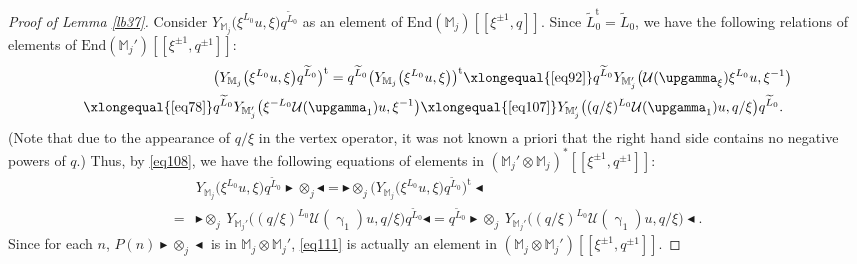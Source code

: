\documentclass[12pt,a4paper,notitlepage]{report}
\theoremstyle{definition}
\theoremstyle{plain}
\newcommand{\mc}{\mathcal}
\newcommand{\wtd}{\widetilde}
\newcommand{\tr}{\mathrm{t}} %
\newcommand{\End}{\mathrm{End}} %
\newcommand{\Mbb}{\mathbb M}
\newcommand{\btl}{\blacktriangleleft}
\newcommand{\btr}{\blacktriangleright}
\numberwithin{equation}{section}
\begin{document}
\begin{proof}[Proof of Lemma \ref{lb37}]
Consider $Y_{\Mbb_j}\big(\xi^{L_0}u,\xi\big)q^{\wtd L_0}$ as an element of $\End(\Mbb_j)[[\xi^{\pm1},q]]$. Since $\wtd L_0^\tr=\wtd L_0$,  we have the following relations of elements of $\End(\Mbb_j')[[\xi^{\pm1},q^{\pm 1}]]$:
\begin{align*}
&\big(Y_{\Mbb_j}\big(\xi^{L_0}u,\xi\big)q^{\wtd L_0}\big)^\tr=q^{\wtd L_0}\big(Y_{\Mbb_j}\big(\xi^{L_0}u,\xi\big)\big)^\tr\xlongequal{\eqref{eq92}}q^{\wtd L_0}Y_{\Mbb_j'}\big(\mc U(\upgamma_\xi)\xi^{L_0}u,\xi^{-1}\big)\\
\xlongequal{\eqref{eq78}}&q^{\wtd L_0}Y_{\Mbb_j'}\big(\xi^{-L_0}\mc U(\upgamma_1)u,\xi^{-1}\big)\xlongequal{\eqref{eq107}}Y_{\Mbb_j'}\big((q/\xi)^{L_0}\mc U(\upgamma_1)u,q/\xi\big)q^{\wtd L_0}.
\end{align*}
(Note that due to the appearance of $q/\xi$ in the vertex operator,  it was not known a priori that the right hand side contains no negative powers of $q$.) Thus, by \eqref{eq108}, we have the following equations of elements in $(\Mbb_j'\otimes\Mbb_j)^*[[\xi^{\pm1},q^{\pm 1}]]$:
\begin{align}
&Y_{\Mbb_j}\big(\xi^{L_0}u,\xi\big)q^{\wtd L_0}\btr\otimes_j\btl=\btr\otimes_j \big(Y_{\Mbb_j}\big(\xi^{L_0}u,\xi\big)q^{\wtd L_0}\big)^\tr\btl\nonumber\\
=&\btr\otimes_j~Y_{\Mbb_j'}\big((q/\xi)^{L_0}\mc U(\upgamma_1)u,q/\xi\big)q^{\wtd L_0}\btl=q^{\wtd L_0}\btr\otimes_j~Y_{\Mbb_j'}\big((q/\xi)^{L_0}\mc U(\upgamma_1)u,q/\xi\big)\btl.\label{eq111}
\end{align}
Since for each $n$, $P(n)\btr\otimes_j\btl$ is in $\Mbb_j\otimes\Mbb_j'$, \eqref{eq111} is actually an element in $(\Mbb_j\otimes\Mbb_j')[[\xi^{\pm1},q^{\pm 1}]]$.


\end{proof}
\end{document}
